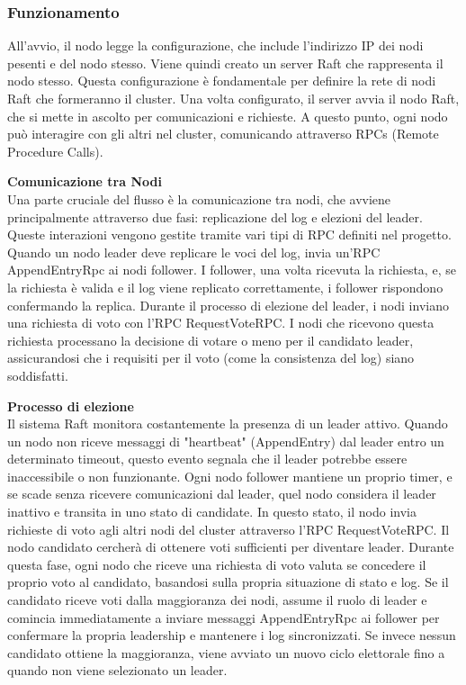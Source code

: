 \subsubsection{Funzionamento}
All'avvio, il nodo legge la configurazione, che include l'indirizzo IP dei nodi pesenti e del nodo stesso. Viene quindi creato un server Raft che rappresenta il nodo stesso. Questa configurazione è fondamentale per definire la 
rete di nodi Raft che formeranno il cluster.
Una volta configurato, il server avvia il nodo Raft, che si mette in ascolto per comunicazioni e richieste. A questo punto, ogni nodo può interagire con gli altri nel cluster, comunicando attraverso RPCs (Remote Procedure Calls).

\textbf{Comunicazione tra Nodi}\\
Una parte cruciale del flusso è la comunicazione tra nodi, che avviene principalmente attraverso due fasi: replicazione del log e elezioni del leader. Queste interazioni vengono gestite tramite vari tipi di RPC definiti nel progetto.
Quando un nodo leader deve replicare le voci del log, invia un'RPC AppendEntryRpc ai nodi follower. I follower, una volta ricevuta la richiesta, e, se la richiesta è valida e il log viene replicato correttamente, i follower 
rispondono confermando la replica.
Durante il processo di elezione del leader, i nodi inviano una richiesta di voto con l'RPC RequestVoteRPC. I nodi che ricevono questa richiesta processano la decisione di votare o meno per il candidato leader, assicurandosi 
che i requisiti per il voto (come la consistenza del log) siano soddisfatti.

\textbf{Processo di elezione}\\
Il sistema Raft monitora costantemente la presenza di un leader attivo. Quando un nodo non riceve messaggi di "heartbeat" (AppendEntry) dal leader entro un determinato timeout, questo evento segnala che il leader potrebbe essere 
inaccessibile o non funzionante. Ogni nodo follower mantiene un proprio timer, e se scade senza ricevere comunicazioni dal leader, quel nodo considera il leader inattivo e transita in uno stato di candidate.
In questo stato, il nodo invia richieste di voto agli altri nodi del cluster attraverso l'RPC RequestVoteRPC. Il nodo candidato cercherà di ottenere voti sufficienti per diventare leader. Durante questa fase, 
ogni nodo che riceve una richiesta di voto valuta se concedere il proprio voto al candidato, basandosi sulla propria situazione di stato e log.
Se il candidato riceve voti dalla maggioranza dei nodi, assume il ruolo di leader e comincia immediatamente a inviare messaggi AppendEntryRpc ai follower per confermare la propria leadership e mantenere i log sincronizzati. 
Se invece nessun candidato ottiene la maggioranza, viene avviato un nuovo ciclo elettorale fino a quando non viene selezionato un leader. 

